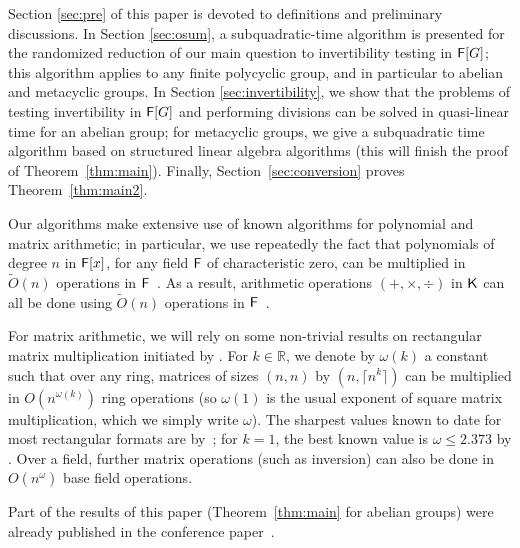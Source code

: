 Section \ref{sec:pre} of this paper is devoted to definitions and
preliminary discussions.  In Section \ref{sec:osum}, a
subquadratic-time algorithm is presented for the randomized reduction
of our main question to invertibility testing in ${\mathsf{F}}[G]$; this
algorithm applies to any finite polycyclic group, and in particular to
abelian and metacyclic groups. In Section \ref{sec:invertibility}, we
show that the problems of testing invertibility in ${\mathsf{F}}[G]$ and
performing divisions can be solved in quasi-linear time for an abelian
group; for metacyclic groups, we give a subquadratic time algorithm
based on structured linear algebra algorithms (this will finish the
proof of Theorem~\ref{thm:main}). Finally,
Section~\ref{sec:conversion} proves Theorem~\ref{thm:main2}.

Our algorithms make extensive use of known algorithms for polynomial and
matrix arithmetic; in particular, we use repeatedly the fact that
polynomials of degree $n$ in ${\mathsf{F}}[x]$, for any field ${\mathsf{F}}$ of
characteristic zero, can be multiplied in $\tilde{O}(n)$ operations in
${\mathsf{F}}$~\citep{ScSt71}. As a result, arithmetic operations
$(+,\times,\div)$ in ${\mathsf{K}}$ can all be done using $\tilde{O}(n)$
operations in ${\mathsf{F}}$~\citep{vzGathen13}.

For matrix arithmetic, we will rely on some non-trivial results on
rectangular matrix multiplication initiated by \cite{LoRo83}. For $k
\in \mathbb{R}$, we denote by $\omega(k)$ a constant such that over
any ring, matrices of sizes $(n,n)$ by $(n,\lceil n^k \rceil)$ can be
multiplied in $O(n^{\omega(k)})$ ring operations (so $\omega(1)$ is
the usual exponent of square matrix multiplication, which we simply
write $\omega$).  The sharpest values known to date for most
rectangular formats are by~\cite{LeGall}; for $k=1$, the best known
value is $\omega \le 2.373$ by .  Over a field,
further matrix operations (such as inversion) can also be done in
$O(n^\omega)$ base field operations.


Part of the results of this paper (Theorem~\ref{thm:main} for abelian
groups) were already published in the conference
paper~\citep{GiJaSc19}.

